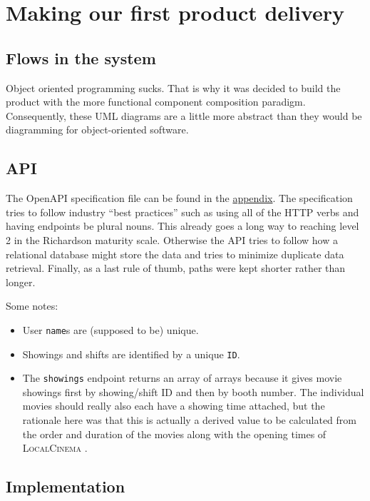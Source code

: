 \chapter{Making our first product delivery}

\section*{Flows in the system}

Object oriented programming sucks.
That is why it was decided to build the product
with the more functional component composition paradigm.
Consequently, these UML diagrams are a little more abstract
than they would be diagramming for object-oriented software.







\section*{API}

The OpenAPI specification file can be found in the
\hyperref[openapi]{appendix}.
The specification tries to follow industry ``best practices''
such as using all of the HTTP verbs
and having endpoints be plural nouns.
This already goes a long way to reaching level 2
in the Richardson maturity scale.
Otherwise the API tries to follow
how a relational database might store the data
and tries to minimize duplicate data retrieval.
Finally, as a last rule of thumb,
paths were kept shorter rather than longer.

Some notes:
\begin{itemize}
	\item User \texttt{name}s are (supposed to be) unique.
	\item Showings and shifts are identified by a unique \texttt{ID}.
	\item The \texttt{showings} endpoint returns an array of arrays
	      because it gives movie showings first by showing/shift ID
	      and then by booth number.
	      The individual movies should really also each have a showing time attached,
	      but the rationale here was that this is actually a derived value to be calculated
	      from the order and duration of the movies along with the opening times of \textsc{LocalCinema} .
\end{itemize}

\section*{Implementation}

